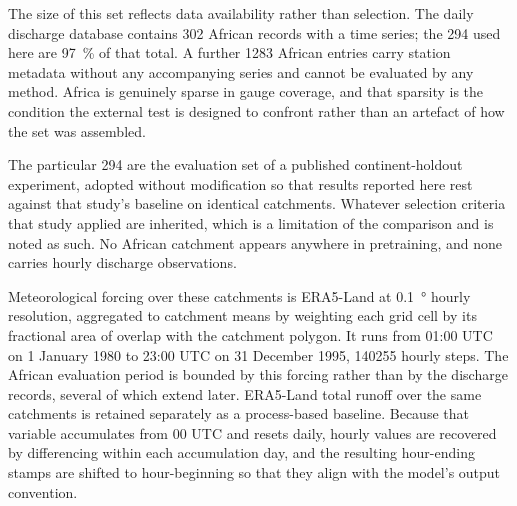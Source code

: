 The size of this set reflects data availability rather than selection. The daily discharge
database contains \num{302} African records with a time series; the \num{294} used here are
\SI{97}{\percent} of that total. A further \num{1283} African entries carry station metadata
without any accompanying series and cannot be evaluated by any method. Africa is genuinely
sparse in gauge coverage, and that sparsity is the condition the external test is designed to
confront rather than an artefact of how the set was assembled.

The particular \num{294} are the evaluation set of a published continent-holdout experiment,
adopted without modification so that results reported here rest against that study's baseline
on identical catchments. Whatever selection criteria that study applied are inherited, which
is a limitation of the comparison and is noted as such. No African catchment appears anywhere
in pretraining, and none carries hourly discharge observations.

Meteorological forcing over these catchments is ERA5-Land at \SI{0.1}{\degree} hourly
resolution, aggregated to catchment means by weighting each grid cell by its fractional area
of overlap with the catchment polygon. It runs from 01:00 UTC on 1 January 1980 to 23:00 UTC
on 31 December 1995, \num{140255} hourly steps. The African evaluation period is bounded by
this forcing rather than by the discharge records, several of which extend later. ERA5-Land total runoff over
the same catchments is retained separately as a process-based baseline. Because that variable
accumulates from 00 UTC and resets daily, hourly values are recovered by differencing within
each accumulation day, and the resulting hour-ending stamps are shifted to hour-beginning so
that they align with the model's output convention.
